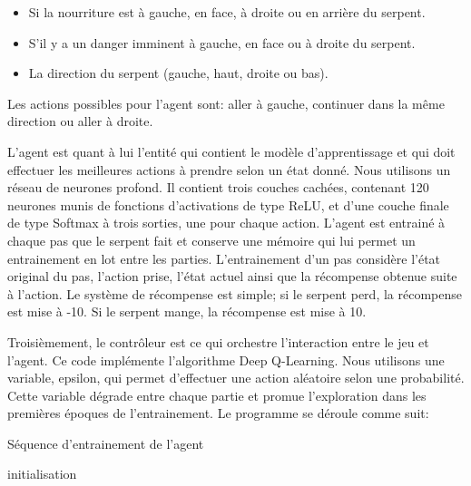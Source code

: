 \documentclass{article}
\begin{document}
\begin{itemize}
	\item Si la nourriture est à gauche, en face, à droite ou en arrière du serpent.
	\item S'il y a un danger imminent à gauche, en face ou à droite du serpent.
	\item La direction du serpent (gauche, haut, droite ou bas).
\end{itemize}

Les actions possibles pour l'agent sont: aller à gauche, continuer dans la même direction ou aller à droite.

L’agent est quant à lui l’entité qui contient le modèle d’apprentissage et qui doit effectuer les meilleures actions à prendre selon un état donné. Nous utilisons un réseau de neurones profond. Il contient trois couches cachées, contenant 120 neurones munis de fonctions d'activations de type ReLU, et d’une couche finale de type Softmax à trois sorties, une pour chaque action. L’agent est entrainé à chaque pas que le serpent fait et conserve une mémoire qui lui permet un entrainement en lot entre les parties. L’entrainement d’un pas considère l’état original du pas, l’action prise, l’état actuel ainsi que la récompense obtenue suite à l’action. Le système de récompense est simple; si le serpent perd, la récompense est mise à -10. Si le serpent mange, la récompense est mise à 10.

Troisièmement, le contrôleur est ce qui orchestre l'interaction entre le jeu et l’agent. Ce code implémente l’algorithme Deep Q-Learning. Nous utilisons une variable, epsilon, qui permet d’effectuer une action aléatoire selon une probabilité. Cette variable dégrade entre chaque partie et promue l’exploration dans les premières époques de l’entrainement. Le programme se déroule comme suit:

\begin{algorithm}
\caption{Séquence d'entrainement de l'agent}
initialisation\;
\end{algorithm}
\end{document}
